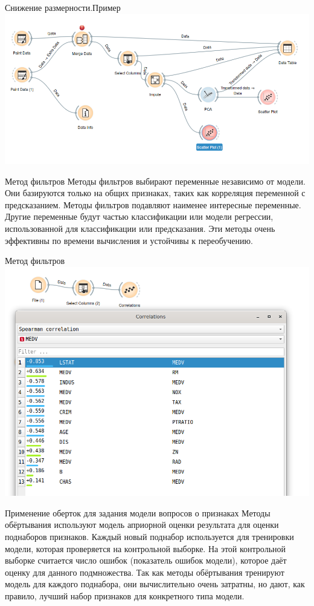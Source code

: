 \documentclass{beamer}
\begin{document}
\begin{frame}{Снижение размерности.Пример}
  \includegraphics[scale=0.3]{task06_01.png}
\end{frame} 
 
 
 \begin{frame}{Метод фильтров}
    Методы фильтров выбирают переменные независимо от модели. Они базируются только на общих признаках, 
    таких как корреляция переменной с предсказанием. Методы фильтров подавляют наименее интересные переменные. 
    Другие переменные будут частью классификации или модели регрессии, использованной для классификации или предсказания.
 Эти методы очень эффективны по времени вычисления и устойчивы к переобучению. 
 \end{frame} 
 
 
 \begin{frame}{Метод фильтров}
  \includegraphics[scale=0.4]{task07_01.png}
 \end{frame} 
 
\begin{frame}{Применение оберток для задания модели вопросов о признаках}
  Методы обёртывания используют модель априорной оценки результата для оценки поднаборов признаков. Каждый новый поднабор используется для тренировки модели,
   которая проверяется на контрольной выборке. 
   На этой контрольной выборке считается число ошибок (показатель ошибок модели), которое даёт оценку для данного подмножества. Так 
   как методы обёртывания тренируют модель для каждого поднабора, они вычислительно очень затратны, но дают, как правило, лучший набор признаков для конкретного типа модели.
\end{frame}
 
\end{document}
